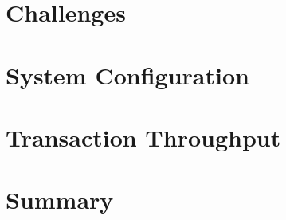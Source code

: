 
\section{Challenges}
\label{ch:eval-challenges}


\section{System Configuration}
\label{ch:eval-sysconfig}


% 

\section{Transaction Throughput}
\label{ch:eval-ttp}


\section{Summary}
\label{ch:eval-summary}

